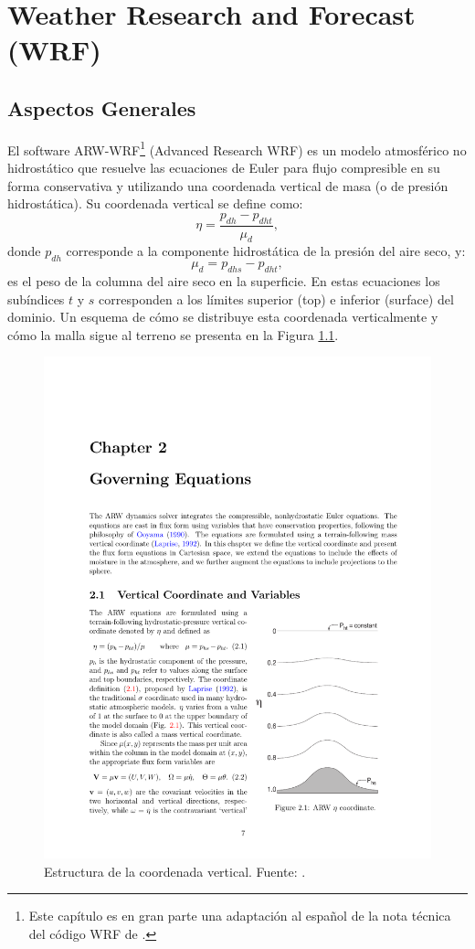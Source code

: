 \chapter{Weather Research and Forecast (WRF)}
\section{Aspectos Generales}
El software ARW-WRF\footnote{Este capítulo es en gran parte una adaptación al español de la nota técnica del código WRF de \cite{https://doi.org/10.5065/d68s4mvh}. } (Advanced Research WRF) es un modelo atmosférico no hidrostático que resuelve las ecuaciones de Euler para flujo compresible en su forma conservativa y utilizando una coordenada vertical de masa (o de presión hidrostática). Su coordenada vertical se define como:
\begin{equation}\label{eq:04_eta}
\eta = \frac{p_{dh}-p_{dht}}{\mu_d},
\end{equation}
donde $p_{dh}$ corresponde a la componente hidrostática de la presión del aire seco, y:
\begin{equation}
\mu_d = p_{dhs} - p_{dht},
\end{equation}
es el peso de la columna del aire seco en la superficie. En estas ecuaciones los subíndices $t$ y $s$ corresponden a los límites superior (top) e inferior (surface) del dominio. Un esquema de cómo se distribuye esta coordenada verticalmente y cómo la malla sigue al terreno se presenta en la Figura \ref{fig:04_eta}.

\begin{figure}[h!]
	\centering
	\includegraphics[width=0.55\linewidth,trim={11.5cm 3.3cm 1cm 14cm},clip]{Imagenes/04/eta}
	\caption{Estructura de la coordenada vertical. Fuente: \cite{https://doi.org/10.5065/d68s4mvh}.}
	\label{fig:04_eta}
\end{figure}

